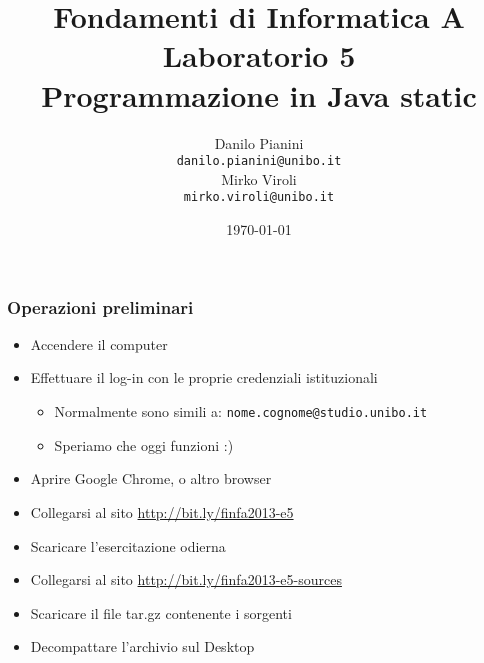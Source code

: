 \documentclass{beamer}
\begin{document}
\title[Lab1 - FV]{Fondamenti di Informatica A \\ Laboratorio 5 \\ Programmazione in Java static}
\author[Danilo Pianini]{Danilo Pianini\\\texttt{danilo.pianini@unibo.it} \\ \vspace{3pt} Mirko Viroli\\\texttt{mirko.viroli@unibo.it} }
\date[\today]{\today}

\frame{\titlepage} 

\begin{frame}
\frametitle{Operazioni preliminari}
\begin{itemize}
 \item Accendere il computer
 \item Effettuare il log-in con le proprie credenziali istituzionali
  \begin{itemize}
    \item Normalmente sono simili a: \texttt{nome.cognome@studio.unibo.it}
    \item Speriamo che oggi funzioni :)
  \end{itemize}
 \item Aprire Google Chrome, o altro browser
 \item Collegarsi al sito \url{http://bit.ly/finfa2013-e5}
 \item Scaricare l'esercitazione odierna
 \item Collegarsi al sito \url{http://bit.ly/finfa2013-e5-sources}
 \item Scaricare il file tar.gz contenente i sorgenti
 \item Decompattare l'archivio sul Desktop
\end{itemize}
\end{frame}
\end{document}

